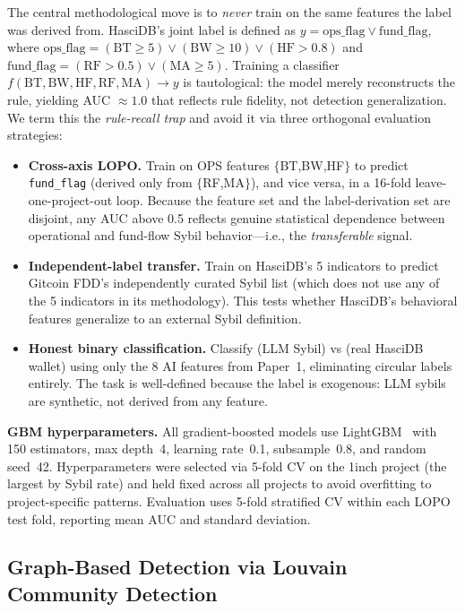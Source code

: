 \documentclass[sigconf,nonacm=false]{acmart}
\begin{document}
The central methodological move is to \textit{never} train on the same features the label was derived from.
HasciDB's joint label is defined as $y = \text{ops\_flag} \lor \text{fund\_flag}$, where $\text{ops\_flag} = (\text{BT}{\ge}5) \lor (\text{BW}{\ge}10) \lor (\text{HF}{>}0.8)$ and $\text{fund\_flag} = (\text{RF}{>}0.5) \lor (\text{MA}{\ge}5)$.
Training a classifier $f(\text{BT}, \text{BW}, \text{HF}, \text{RF}, \text{MA}) \to y$ is tautological: the model merely reconstructs the rule, yielding AUC $\approx 1.0$ that reflects rule fidelity, not detection generalization.
We term this the \textit{rule-recall trap} and avoid it via three orthogonal evaluation strategies:

\begin{itemize}
  \item \textbf{Cross-axis LOPO.} Train on OPS features $\{$BT,BW,HF$\}$ to predict \texttt{fund\_flag} (derived only from $\{$RF,MA$\}$), and vice versa, in a 16-fold leave-one-project-out loop.
  Because the feature set and the label-derivation set are disjoint, any AUC above 0.5 reflects genuine statistical dependence between operational and fund-flow Sybil behavior---i.e., the \textit{transferable} signal.
  \item \textbf{Independent-label transfer.} Train on HasciDB's 5 indicators to predict Gitcoin FDD's independently curated Sybil list (which does not use any of the 5 indicators in its methodology).
  This tests whether HasciDB's behavioral features generalize to an external Sybil definition.
  \item \textbf{Honest binary classification.} Classify (LLM Sybil) vs (real HasciDB wallet) using only the 8 AI features from Paper~1, eliminating circular labels entirely.
  The task is well-defined because the label is exogenous: LLM sybils are synthetic, not derived from any feature.
\end{itemize}

\noindent\textbf{GBM hyperparameters.}
All gradient-boosted models use LightGBM~\cite{ke2017lightgbm} with 150 estimators, max depth~4, learning rate~0.1, subsample~0.8, and random seed~42.
Hyperparameters were selected via 5-fold CV on the 1inch project (the largest by Sybil rate) and held fixed across all \largeScaleNProjects{} projects to avoid overfitting to project-specific patterns.
Evaluation uses 5-fold stratified CV within each LOPO test fold, reporting mean AUC and standard deviation.

\subsection{Graph-Based Detection via Louvain Community Detection}
\label{sec:methods:graph}
\end{document}
